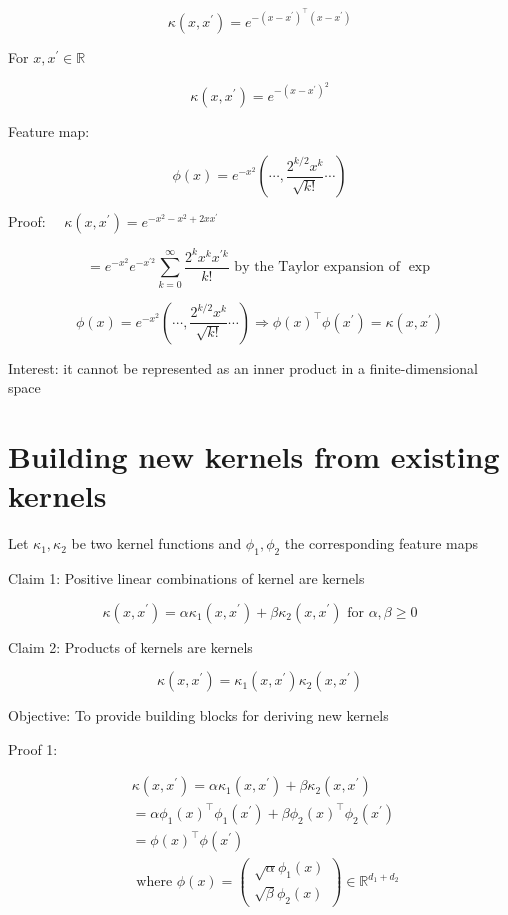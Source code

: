 $$
\kappa\left(x, x^{\prime}\right)=e^{-\left(x-x^{\prime}\right)^{\top}\left(x-x^{\prime}\right)}
$$

For $x, x^{\prime} \in \mathbb{R}$

$$
\kappa\left(x, x^{\prime}\right)=e^{-\left(x-x^{\prime}\right)^{2}}
$$

Feature map:

$$
\phi(x)=e^{-x^{2}}\left(\cdots, \frac{2^{k / 2} x^{k}}{\sqrt{k !}} \cdots\right)
$$

Proof: $\quad \kappa\left(x, x^{\prime}\right)=e^{-x^{2}-x^{2}+2 x x^{\prime}}$

$$
=e^{-x^{2}} e^{-x^{\prime 2}} \sum_{k=0}^{\infty} \frac{2^{k} x^{k} x^{\prime k}}{k !} \text { by the Taylor expansion of } \exp
$$

$$
\phi(x)=e^{-x^{2}}\left(\cdots, \frac{2^{k / 2} x^{k}}{\sqrt{k !}} \cdots\right) \Longrightarrow \phi(x)^{\top} \phi\left(x^{\prime}\right)=\kappa\left(x, x^{\prime}\right)
$$

Interest: it cannot be represented as an inner product in a finite-dimensional space

\section*{Building new kernels from existing kernels}
Let $\kappa_{1}, \kappa_{2}$ be two kernel functions and $\phi_{1}, \phi_{2}$ the corresponding feature maps

Claim 1: Positive linear combinations of kernel are kernels

$$
\kappa\left(x, x^{\prime}\right)=\alpha \kappa_{1}\left(x, x^{\prime}\right)+\beta \kappa_{2}\left(x, x^{\prime}\right) \text { for } \alpha, \beta \geq 0
$$

Claim 2: Products of kernels are kernels

$$
\kappa\left(x, x^{\prime}\right)=\kappa_{1}\left(x, x^{\prime}\right) \kappa_{2}\left(x, x^{\prime}\right)
$$

Objective: To provide building blocks for deriving new kernels

Proof 1:

$$
\begin{aligned}
& \kappa\left(x, x^{\prime}\right)=\alpha \kappa_{1}\left(x, x^{\prime}\right)+\beta \kappa_{2}\left(x, x^{\prime}\right) \\
& =\alpha \phi_{1}(x)^{\top} \phi_{1}\left(x^{\prime}\right)+\beta \phi_{2}(x)^{\top} \phi_{2}\left(x^{\prime}\right) \\
& =\phi(x)^{\top} \phi\left(x^{\prime}\right) \\
& \text { where } \phi(x)=\left(\begin{array}{c}
\sqrt{\alpha} \phi_{1}(x) \\
\sqrt{\beta} \phi_{2}(x)
\end{array}\right) \in \mathbb{R}^{d_{1}+d_{2}}
\end{aligned}
$$

